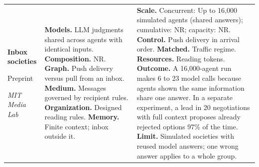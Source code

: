 \begin{longtable}{@{}>{\raggedright\arraybackslash}p{}>{\raggedright\arraybackslash}p{}>{\raggedright\arraybackslash}p{}@{}}
\textbf{Inbox societies}\par \citep{inbox-coordination-primitive}\par Preprint\par\emph{MIT Media Lab} & \textbf{Models.} LLM judgments shared across agents with identical inputs. \textbf{Composition.} NR. \textbf{Graph.} Push delivery versus pull from an inbox. \textbf{Medium.} Messages governed by recipient rules. \textbf{Organization.} Designed reading rules. \textbf{Memory.} Finite context; inbox outside it. & \textbf{Scale.} Concurrent: Up to 16,000 simulated agents (shared answers); cumulative: NR; capacity: NR. \textbf{Control.} Push delivery in arrival order. \textbf{Matched.} Traffic regime. \textbf{Resources.} Reading tokens. \textbf{Outcome.} A 16,000-agent run makes 6 to 23 model calls because agents shown the same information share one answer. In a separate experiment, a lead in 20 negotiations with full context proposes already rejected options 97\% of the time. \textbf{Limit.} Simulated societies with reused model answers; one wrong answer applies to a whole group. \\
\end{longtable}
\endgroup

